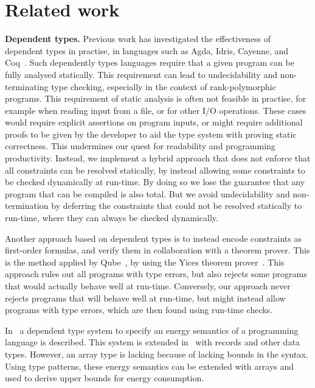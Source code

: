 
\newcommand{\slicepatterns}{%
\url{https://blog.rust-lang.org/2018/05/10/Rust-1.26.html\#basic-slice-patterns}}
\newcommand{\subslicepatterns}{%
\url{https://blog.rust-lang.org/2020/03/12/Rust-1.42.html\#subslice-patterns}}
\newcommand{\listpatterns}{%
\url{https://learn.microsoft.com/dotnet/csharp/language-reference/operators/patterns\#list-patterns}}

\section{Related work}

\textbf{Dependent types.}
Previous work has investigated the effectiveness of dependent types in practise, in languages such as Agda, Idris, Cayenne, and Coq~\cite{agda, idris, cayenne, coq}.
Such dependently types languages require that a given program can be fully analysed statically.
This requirement can lead to undecidability and non-terminating type checking, especially in the context of rank-polymorphic programs.
This requirement of static analysis is often not feasible in practise, for example when reading input from a file, or for other I/O operations.
These cases would require explicit assertions on program inputs, or might require additional proofs to be given by the developer to aid the type system with proving static correctness.
This undermines our quest for readability and programming productivity.
Instead, we implement a hybrid approach that does not enforce that all constraints can be resolved statically, by instead allowing some constraints to be checked dynamically at run-time.
By doing so we lose the guarantee that any program that can be compiled is also total.
But we avoid undecidability and non-termination by deferring the constraints that could not be resolved statically to run-time, where they can always be checked dynamically.

Another approach based on dependent types is to instead encode constraints as first-order formulas, and verify them in collaboration with a theorem prover.
This is the method applied by Qube~\cite{qube}, by using the Yices theorem prover~\cite{yices}.
This approach rules out all programs with type errors, but also rejects some programs that would actually behave well at run-time.
Conversely, our approach never rejects programs that will behave well at run-time, but might instead allow programs with type errors, which are then found using run-time checks.

In~\cite{DBLP:conf/fopara/GastelKE15} a dependent type system to specify an energy semantics of a programming language is described.
This system is extended in~\cite{DBLP:journals/corr/GastelE17} with records and other data types.
However, an array type is lacking because of lacking bounds in the syntax.
Using type patterns, these energy semantics can be extended with arrays and used to derive upper bounds for energy consumption.

